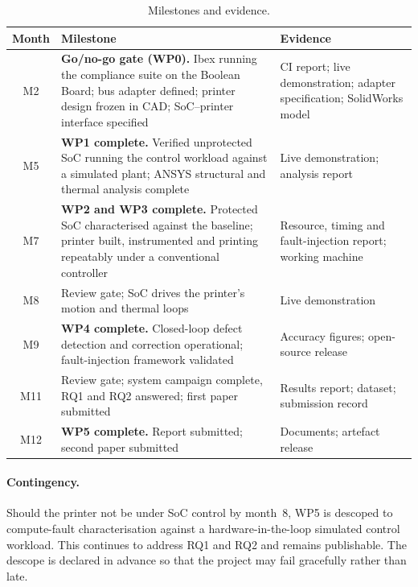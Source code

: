 \documentclass[11pt,a4paper]{article}
\begin{document}
\begin{table}[htbp]
\centering
\caption{Milestones and evidence.}
\label{tab:milestones}
\small
\begin{tabularx}{\textwidth}{@{}c X L{4.4cm}@{}}
\toprule
\textbf{Month} & \textbf{Milestone} & \textbf{Evidence} \\
\midrule
M2  & \textbf{Go/no-go gate (WP0).} Ibex running the compliance suite on the
      Boolean Board; bus adapter defined; printer design frozen in CAD;
      SoC--printer interface specified &
      CI report; live demonstration; adapter specification; SolidWorks model \\
M5  & \textbf{WP1 complete.} Verified unprotected SoC running the control
      workload against a simulated plant; ANSYS structural and thermal analysis
      complete & Live demonstration; analysis report \\
M7  & \textbf{WP2 and WP3 complete.} Protected SoC characterised against the
      baseline; printer built, instrumented and printing repeatably under a
      conventional controller & Resource, timing and fault-injection report;
      working machine \\
M8  & Review gate; SoC drives the printer's motion and thermal loops &
      Live demonstration \\
M9  & \textbf{WP4 complete.} Closed-loop defect detection and correction
      operational; fault-injection framework validated & Accuracy figures;
      open-source release \\
M11 & Review gate; system campaign complete, RQ1 and RQ2 answered; first paper
      submitted & Results report; dataset; submission record \\
M12 & \textbf{WP5 complete.} Report submitted; second paper submitted &
      Documents; artefact release \\
\bottomrule
\end{tabularx}
\end{table}

\paragraph{Contingency.}
Should the printer not be under SoC control by month~8, WP5 is descoped to
compute-fault characterisation against a hardware-in-the-loop simulated control
workload. This continues to address RQ1 and RQ2 and remains publishable. The
descope is declared in advance so that the project may fail gracefully rather
than late.

\end{document}

